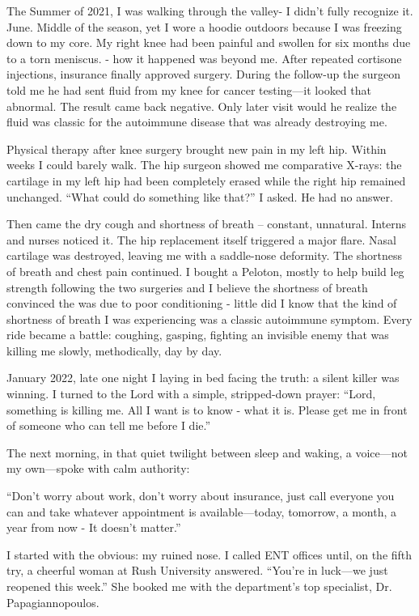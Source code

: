 \documentclass[12pt,a4paper]{book}
\begin{document}
The Summer of 2021, I was walking through the valley- I didn't fully recognize it.  June.  Middle of the season, yet I wore a hoodie outdoors because I was freezing down to my core. My right knee had been painful and swollen for six months due to a torn meniscus. - how it happened was beyond me.  After repeated cortisone injections, insurance finally approved surgery.   During the follow-up the surgeon told me he had sent fluid from my knee for cancer testing—it looked that abnormal. The result came back negative.   Only later visit would he realize the fluid was classic for the autoimmune disease that was already destroying me.

Physical therapy after knee surgery brought new pain in my left hip.   Within weeks I could barely walk.  The hip surgeon showed me comparative X-rays: the cartilage in my left hip had been completely erased while the right hip remained unchanged. “What could do something like that?” I asked. He had no answer.

Then came the dry cough and shortness of breath -- constant, unnatural.   Interns and nurses noticed it.  The hip replacement itself triggered a major flare.   Nasal cartilage was destroyed, leaving me with a saddle-nose deformity.   The shortness of breath and chest pain continued.  I bought a Peloton, mostly to help build leg strength following the two surgeries and I believe the shortness of breath convinced the was due to poor conditioning - little did I know that the kind of shortness of breath I was experiencing was a classic autoimmune symptom. Every ride became a battle: coughing, gasping, fighting an invisible enemy that was killing me slowly, methodically, day by day.

January 2022, late one night I laying in bed facing the truth: a silent killer was winning.   I turned to the Lord with a simple, stripped-down prayer: “Lord, something is killing me.   All I want is to know - what it is.   Please get me in front of someone who can tell me before I die.”

The next morning, in that quiet twilight between sleep and waking, a voice—not my own—spoke with calm authority:

“Don’t worry about work, don’t worry about insurance, just call everyone you can and take whatever appointment is available—today, tomorrow, a month, a year from now - It doesn’t matter.”

I started with the obvious: my ruined nose. I called ENT offices until, on the fifth try, a cheerful woman at Rush University answered. “You’re in luck—we just reopened this week.” She booked me with the department’s top specialist, Dr. Papagiannopoulos.
\end{document}
